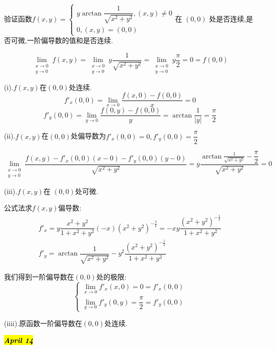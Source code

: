 验证函数$f(x,y)=\left\lbrace
\begin{array}{l}
	y\arctan\dfrac{1}{\sqrt{x^2+y^2}},(x,y)\neq 0\\
	0,(x,y)=(0,0)
\end{array}
\right. $在 $(0,0)$ 处是否连续,是否可微,一阶偏导数的值和是否连续.
\begin{solution}
	$$\lim\limits_{\substack{x\rightarrow 0\\ y\rightarrow 0}}f(x,y)=\lim\limits_{\substack{x\rightarrow 0\\ y\rightarrow 0}}y\frac{1}{\sqrt{x^2+y^2}}=\lim\limits_{\substack{x\rightarrow 0\\ y\rightarrow 0}}y\frac{\pi}{2}=0=f(0,0)$$
	
	(i).$f(x,y)$在$(0,0)$处连续.
	$$f'_{x}(0,0)=\lim\limits_{x\rightarrow 0}\frac{f(x,0)-f(0,0)}{x}=0$$
	$$f'_{y}(0,0)=\lim\limits_{y\rightarrow 0}\frac{f(0,y)-f(0,0)}{y}=\arctan\frac{1}{|y|}=\frac{\pi}{2}$$
	
	(ii).$f(x,y)$在$(0,0)$处偏导数为$f'_{x}(0,0)=0,f'_{y}(0,0)=\dfrac{\pi}{2}$
	
	$$\lim\limits_{\substack{x\rightarrow 0\\ y\rightarrow 0}}\frac{f(x,y)-f'_{x}(0,0)(x-0)-f'_{y}(0,0)(y-0)}{\sqrt{x^2+y^2}}=y\dfrac{\arctan\frac{1}{\sqrt{x^2+y^2}}-\dfrac{\pi}{2}}{\sqrt{x^2+y^2}}=0$$
	
	(iii).$f(x,y)$在 $(0,0)$处可微.
	
	公式法求$f(x,y)$偏导数: 
	$$\begin{array}{l}
		f'_{x}=y\dfrac{x^2+y^2}{1+x^2+y^2}(-x)(x^2+y^2)^{-\frac{3}{2}}=-xy\dfrac{(x^2+y^2)^{-\frac{1}{2}}}{1+x^2+y^2}\\
		f'_{y}=\arctan\dfrac{1}{\sqrt{x^2+y^2}}-y^2\dfrac{(x^2+y^2)^{-\frac{1}{2}}}{1+x^2+y^2}
	\end{array}$$
	
	我们得到一阶偏导数在$(0,0)$处的极限: 
	$$\left\lbrace \begin{array}{l}
		\lim\limits_{x\rightarrow0}f'_{x}(x,0)=0=f'_{x}(0,0)\\
		\lim\limits_{y\rightarrow0}f'_{y}(0,y)=\dfrac{\pi}{2}=f'_{y}(0,0)
	\end{array}\right. $$
	
	(iiii).原函数一阶偏导数在$(0,0)$处连续.
\end{solution}

\hl{\textbf{\textit{April 14}}}

